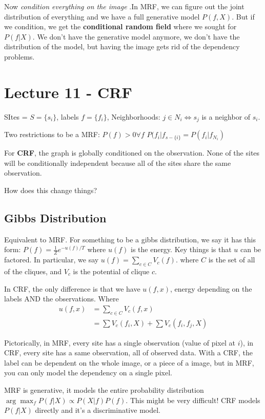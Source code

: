 Now \emph{condition everything on the image} .In MRF, we can figure
out the joint distribution of everything and we have a full generative
model $P(f, X)$. But if we condition, we get the \textbf{conditional
  random field} where we sought for $P(f|X)$. We don't have the
generative model anymore, we don't have the distribution of the model,
but having the image gets rid of the dependency problems. 

\pagebreak

\section{Lecture 11 - CRF}
\label{sec:lecture-11}
SItes = $S=\{s_i\}$, labels $f=\{f_i\}$, Neighborhoods: $j\in N_i \iff
s_j $ is a neighbor of $s_i$. 

Two restrictions to be a MRF:
$P(f) > 0 \forall f$
$P(f_i | f_{s-\{i\}} = P(f_i | f_{N_i})$ 

For \textbf{CRF}, the graph is globally conditioned on the observation. None of
the sites will be conditionally independent because all of the sites
share the same observation.

How does this change things?

\subsection{Gibbs Distribution}
Equivalent to MRF. For something to be a gibbs distribution, we say it
has this form: $P(f) = \frac{1}{Z}e^{ -u(f)/T}$ where $u(f)$ is the
energy. Key things is that $u$ can be factored. In particular, we say
$u(f) = \sum_{c\in C} V_c(f)$. where $C$ is the set of all of the
cliques, and $V_c$ is the potential of clique $c$.

In CRF, the only difference is that we have $u(f, x)$, energy
depending on the labels AND the observations. Where
\begin{align*}
  u(f,x) &= \sum_{c\in C} V_c(f,x)  \label{eq:35}\\
&= \sum V_c(f_i, X) + \sum V_c(f_i, f_j, X)
\end{align*}

Pictorically, in MRF, every site has a single observation (value of
pixel at $i$), in CRF, every site has a same observation, all of
observed data. With a CRF, the label can be dependent on the whole
image, or a piece of a image, but in MRF, you can only model the
dependency on a single pixel.

MRF is generative, it models the entire probability distribution
$\arg\max_f P(f|X) \propto P(X|f)P(f)$. This might be very difficult! CRF models
$P(f|X)$ directly and it's a discriminative model.

